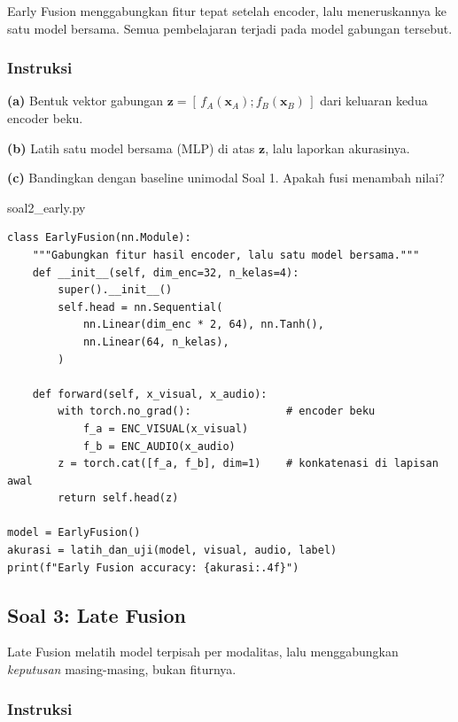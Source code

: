 \documentclass[12pt, a4paper]{article}
\begin{document}
Early Fusion menggabungkan fitur tepat setelah encoder, lalu meneruskannya ke satu model
bersama. Semua pembelajaran terjadi pada model gabungan tersebut.

\subsubsection{Instruksi}
\label{sec:soal2-instruksi}

\textbf{(a)} Bentuk vektor gabungan $\mathbf{z} = [\,f_A(\mathbf{x}_A) ; f_B(\mathbf{x}_B)\,]$
dari keluaran kedua encoder beku.

\textbf{(b)} Latih satu model bersama (MLP) di atas $\mathbf{z}$, lalu laporkan akurasinya.

\textbf{(c)} Bandingkan dengan baseline unimodal Soal 1. Apakah fusi menambah nilai?

\begin{codewindow}{soal2\_early.py}
\begin{lstlisting}[style=pycode]
class EarlyFusion(nn.Module):
    """Gabungkan fitur hasil encoder, lalu satu model bersama."""
    def __init__(self, dim_enc=32, n_kelas=4):
        super().__init__()
        self.head = nn.Sequential(
            nn.Linear(dim_enc * 2, 64), nn.Tanh(),
            nn.Linear(64, n_kelas),
        )

    def forward(self, x_visual, x_audio):
        with torch.no_grad():               # encoder beku
            f_a = ENC_VISUAL(x_visual)
            f_b = ENC_AUDIO(x_audio)
        z = torch.cat([f_a, f_b], dim=1)    # konkatenasi di lapisan awal
        return self.head(z)

model = EarlyFusion()
akurasi = latih_dan_uji(model, visual, audio, label)
print(f"Early Fusion accuracy: {akurasi:.4f}")
\end{lstlisting}
\end{codewindow}

\subsection{Soal 3: Late Fusion}
\label{sec:soal3}

Late Fusion melatih model terpisah per modalitas, lalu menggabungkan \emph{keputusan}
masing-masing, bukan fiturnya.

\subsubsection{Instruksi}
\label{sec:soal3-instruksi}
\end{document}
